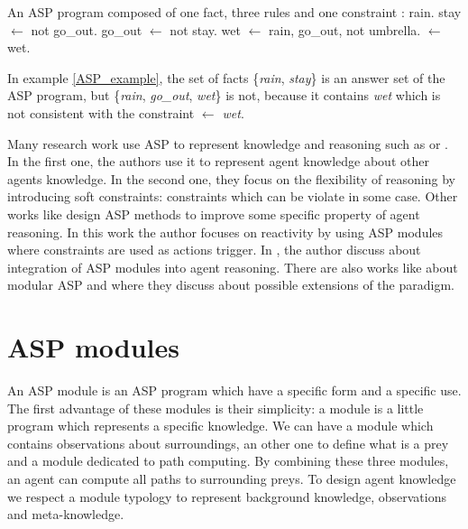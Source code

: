 \documentclass{aamas2012}
\begin{document}
	\begin{example}
		\label{ASP_example}
		An ASP program composed of one fact, three rules and one constraint :\newline
		\newline
		rain.\newline
		stay $\leftarrow$ not go\_out.\newline
		go\_out $\leftarrow$ not stay.\newline
		wet $\leftarrow$ rain, go\_out, not umbrella.\newline
		$\leftarrow$ wet.
	\end{example}
	
	In example \ref{ASP_example}, the set of facts \{\emph{rain}, \emph{stay}\} is an answer set of the ASP program, but \{\emph{rain}, \emph{go\_out}, \emph{wet}\} is not, 
	because it contains \emph{wet} which is not consistent with the constraint \emph{$\leftarrow$ wet}.

	Many research work use ASP to represent knowledge and reasoning such as \cite{DBLP:conf/atal/BaralGSP10} or \cite{DBLP:conf/clima/NieuwenborghVHV06}.
	In the first one, the authors use it to represent agent knowledge about other agents knowledge.
	In the second one, they focus on the flexibility of reasoning by introducing soft constraints: constraints which can be violate in some case.
	Other works like \cite{DBLP:conf/datalog/Costantini10} design ASP methods to improve some specific property of agent reasoning.
	In this work the author focuses on reactivity by using ASP modules where constraints are used as actions trigger.
	In \cite{DBLP:conf/lpnmr/Costantini09}, the author discuss about integration of ASP modules into agent reasoning.
	There are also works like \cite{DBLP:conf/aaaiss/BaralAD06} about modular ASP and 
	\cite{DBLP:conf/birthday/FaberW11} where they discuss about possible extensions of the paradigm.

\section{ASP modules}

	An ASP module is an ASP program which have a specific form and a specific use.
	The first advantage of these modules is their simplicity: a module is a little program which represents a specific knowledge.
	We can have a module which contains observations about surroundings,
	an other one to define what is a prey and a module dedicated to path computing.
	By combining these three modules, an agent can compute all paths to surrounding preys.
	To design agent knowledge we respect a module typology to represent background knowledge, observations and meta-knowledge.
\end{document}

